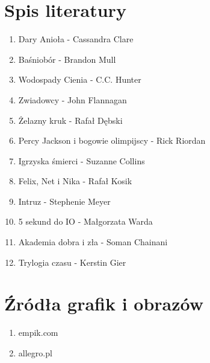 \documentclass{article}
\begin{document}
\section{Spis literatury}
\begin{enumerate}
    \item Dary Anioła - Cassandra Clare

    \item Baśniobór - Brandon Mull

    \item Wodospady Cienia - C.C. Hunter
	
	\item Zwiadowcy - John Flannagan
	
	\item Żelazny kruk - Rafał Dębski

    \item Percy Jackson i bogowie olimpijscy - Rick Riordan

    \item Igrzyska śmierci - Suzanne Collins
	
	\item Felix, Net i Nika - Rafał Kosik
	
	\item Intruz - Stephenie Meyer

    \item 5 sekund do IO - Małgorzata Warda

    \item Akademia dobra i zła - Soman Chainani
	
	\item Trylogia czasu - Kerstin Gier

\end{enumerate}

\section{Źródła grafik i obrazów}
\begin{enumerate}
    \item empik.com 

    \item allegro.pl

\end{enumerate}
\end{document}

